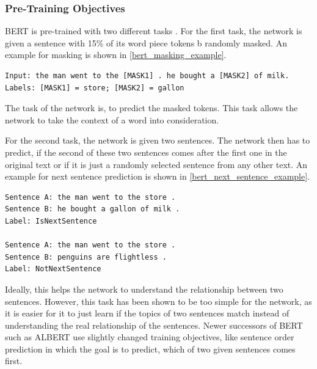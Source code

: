 \subsubsection{Pre-Training Objectives}

BERT is pre-trained with two different tasks \cite[p.~4--5]{devlin2018bert}.
For the first task, the network is given a sentence with 15\% of its word piece tokens b randomly masked.
An example for masking is shown in \autoref{bert_masking_example}.

\begin{lstlisting}[caption={Masked input example. Taken from the BERT GitHub page.},captionpos=b,numbers=none,label=bert_masking_example]
Input: the man went to the [MASK1] . he bought a [MASK2] of milk.
Labels: [MASK1] = store; [MASK2] = gallon
\end{lstlisting}

The task of the network is, to predict the masked tokens.
This task allows the network to take the context of a word into consideration.

For the second task, the network is given two sentences.
The network then has to predict, if the second of these two sentences comes after the first one in the original text or if it is just a randomly selected sentence from any other text.
An example for next sentence prediction is shown in \autoref{bert_next_sentence_example}.

\begin{lstlisting}[caption={Next sentence prediction example. Taken from the BERT GitHub page.},captionpos=b,numbers=none,label=bert_next_sentence_example]
Sentence A: the man went to the store .
Sentence B: he bought a gallon of milk .
Label: IsNextSentence

Sentence A: the man went to the store .
Sentence B: penguins are flightless .
Label: NotNextSentence
\end{lstlisting}

Ideally, this helps the network to understand the relationship between two sentences.
However, this task has been shown to be too simple for the network, as it is easier for it to just learn if the topics of two sentences match instead of understanding the real relationship of the sentences.
Newer successors of BERT such as ALBERT use slightly changed training objectives, like sentence order prediction \cite[p.~3]{1909.11942} in which the goal is to predict, which of two given sentences comes first.

